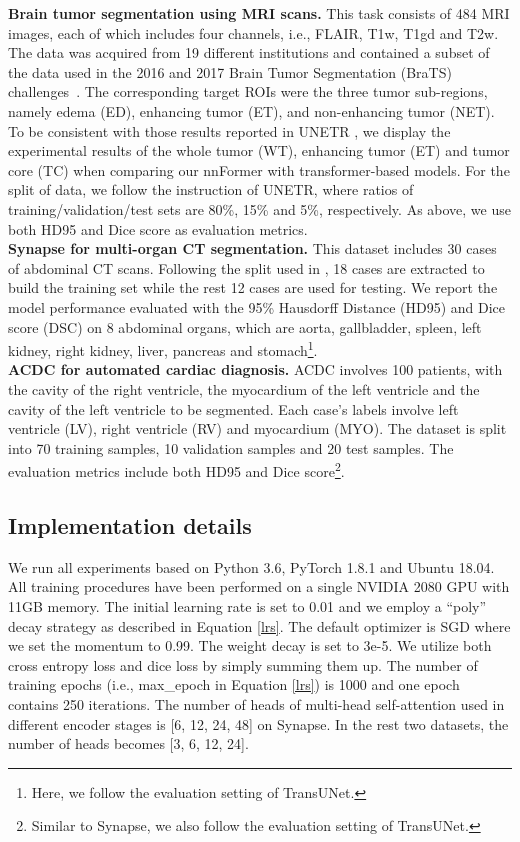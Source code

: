 \documentclass[journal,twoside,web]{ieeecolor}
\begin{document}
\noindent \textbf{Brain tumor segmentation using MRI scans.} This task consists of 484 MRI images, each of which includes four channels, i.e., FLAIR, T1w, T1gd and T2w. The
data was acquired from 19 different institutions and contained a subset of the data used in the
2016 and 2017 Brain Tumor Segmentation (BraTS) challenges~\cite{menze2014multimodal}. The corresponding target ROIs were the three tumor sub-regions, namely edema (ED), enhancing tumor (ET), and non-enhancing tumor (NET). To be consistent with those results reported in UNETR \cite{Hatamizadeh_2022_WACV}, we display the experimental results of the whole tumor
(WT), enhancing tumor (ET) and tumor core (TC) when comparing our nnFormer with transformer-based models. For the split of data, we follow the instruction of UNETR, where ratios of training/validation/test sets are 80\%, 15\% and 5\%, respectively. As above, we use both HD95 and Dice score as evaluation metrics.\\

\noindent \textbf{Synapse for multi-organ CT segmentation.} This dataset includes 30 cases of abdominal CT scans. Following the split used in \cite{chen2021transunet}, 18 cases are extracted to build the training set while the rest 12 cases are used for testing. We report the model performance evaluated with the 95\% Hausdorff Distance (HD95) and Dice score (DSC) on 8 abdominal organs, which are aorta, gallbladder, spleen, left kidney, right kidney, liver, pancreas and stomach\footnote{Here, we follow the evaluation setting of TransUNet.}.\\

\noindent \textbf{ACDC for automated cardiac diagnosis.} ACDC involves 100 patients, with the cavity of the right ventricle, the myocardium of the left ventricle and the cavity of the left ventricle to be segmented. Each case's labels involve left ventricle (LV), right ventricle (RV) and myocardium (MYO). The dataset is split into 70 training samples, 10 validation samples and 20 test samples. The evaluation metrics include both HD95 and Dice score\footnote{Similar to Synapse, we also follow the evaluation setting of TransUNet.}.\\



\subsection{Implementation details}
We run all experiments based on Python 3.6, PyTorch 1.8.1 and Ubuntu 18.04. All training procedures have been performed on a single NVIDIA 2080 GPU with 11GB memory. The initial learning rate is set to 0.01 and we employ a ``poly'' decay strategy as described in Equation \ref{lrs}. The default optimizer is SGD where we set the momentum to 0.99. The weight decay is set to 3e-5. We utilize both cross entropy loss and dice loss by simply summing them up. The number of training epochs (i.e., max\_epoch in Equation \ref{lrs}) is 1000 and one epoch contains 250 iterations. The number of heads of multi-head self-attention used in different encoder stages is [6, 12, 24, 48] on Synapse. In the rest two datasets, the number of heads becomes [3, 6, 12, 24].
\end{document}

